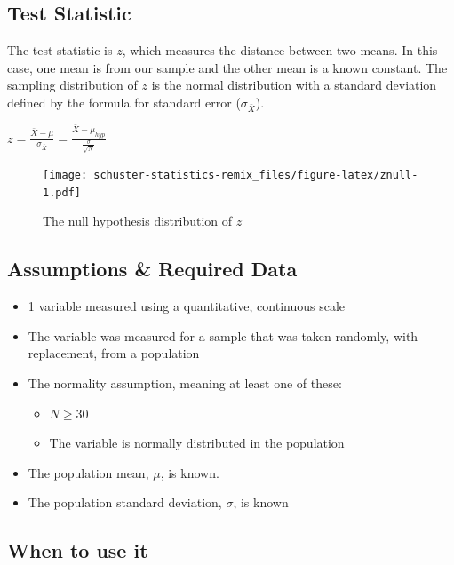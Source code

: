 \documentclass[
]{book}
\providecommand{\tightlist}{%
  \setlength{\itemsep}{0pt}\setlength{\parskip}{0pt}}
\begin{document}
\hypertarget{test-statistic}{%
\subsection{Test Statistic}\label{test-statistic}}

The test statistic is \(z\), which measures the distance between two means. In this case, one mean is from our sample and the other mean is a known constant. The sampling distribution of \(z\) is the normal distribution with a standard deviation defined by the formula for standard error (\(\sigma_{\bar{X}}\)).

\(z = \frac{\bar{X}-\mu}{\sigma_{\bar{X}}} = \frac{\bar{X}-\mu_{hyp}}{\frac{\sigma}{\sqrt{N}}}\)

\begin{figure}
\centering
\texttt{[image: schuster-statistics-remix\_files/figure-latex/znull-1.pdf]}
\caption{\label{fig:znull}The null hypothesis distribution of \(z\)}
\end{figure}

\hypertarget{assumptions-required-data}{%
\subsection{Assumptions \& Required Data}\label{assumptions-required-data}}

\begin{itemize}
\tightlist
\item
  1 variable measured using a quantitative, continuous scale
\item
  The variable was measured for a sample that was taken randomly, with replacement, from a population
\item
  The normality assumption, meaning at least one of these:

  \begin{itemize}
  \tightlist
  \item
    \(N \ge 30\)
  \item
    The variable is normally distributed in the population
  \end{itemize}
\item
  The population mean, \(\mu\), is known.
\item
  The population standard deviation, \(\sigma\), is known
\end{itemize}

\hypertarget{when-to-use-it}{%
\subsection{When to use it}\label{when-to-use-it}}
\end{document}
